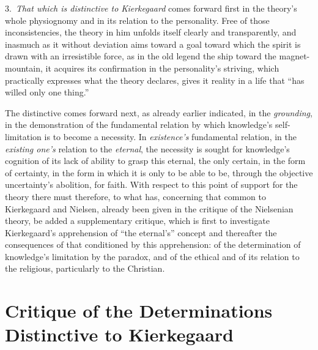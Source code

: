 \documentclass[12pt,a4paper]{book}
\begin{document}
3.~\emph{That which is distinctive to Kierkegaard} comes forward first in the theory's whole physiognomy
and in its relation to the personality. Free of those inconsistencies, the theory in him unfolds itself
clearly and transparently, and inasmuch as it without deviation aims toward a goal toward which the
spirit is drawn with an irresistible force, as in the old legend the ship toward the magnet-mountain, it
acquires its confirmation in the personality's striving, which practically expresses what the theory
declares, gives it reality in a life that ``has willed only one thing.''

The distinctive comes forward next, as already earlier indicated, in the \emph{grounding}, in the demonstration
of the fundamental relation by which knowledge's self-limitation is to become a necessity. In
\emph{existence's} fundamental relation, in the \emph{existing one's} relation to the \emph{eternal}, the necessity is
sought for knowledge's cognition of its lack of ability to grasp this eternal, the only certain, in the
form of certainty, in the form in which it is only to be able to be, through the objective uncertainty's
abolition, for faith. With respect to this point of support for the theory there must therefore, to what
has, concerning that common to Kierkegaard and Nielsen, already been given in the critique of the
Nielsenian theory, be added a supplementary critique, which is first to investigate Kierkegaard's
apprehension of ``the eternal's'' concept and thereafter the consequences of that conditioned by this
apprehension: of the determination of knowledge's limitation by the paradox, and of the ethical and of
its relation to the religious, particularly to the Christian.

\section{Critique of the Determinations Distinctive to Kierkegaard}
\label{sec:kierkegaard-critique}
\end{document}
